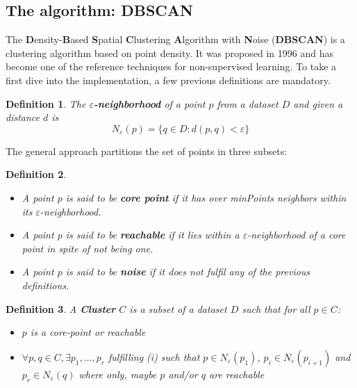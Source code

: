 \documentclass[10pt,journal,compsoc]{IEEEtran}
\newtheorem{definition}{Definition}
\begin{document}
\subsection{The algorithm: DBSCAN} \label{the_algorithm}


The \textbf{D}ensity-\textbf{B}ased \textbf{S}patial \textbf{C}lustering \textbf{A}lgorithm with \textbf{N}oise (\textbf{DBSCAN}) is a clustering algorithm based on point density. It was proposed in 1996 \cite{ReferencePaper} and has become one of the reference techniques for non-supervised learning. To take a first dive into the implementation, a few previous definitions are mandatory.

\begin{definition}
The $\varepsilon$\textbf{-neighborhood} of a point $p$ from a dataset $D$ and given a distance $d$ is
$$N_{\varepsilon}(p) = \lbrace q \in D: d(p,q) < \varepsilon \rbrace$$ 
\end{definition}

The general approach partitions the set of points in three subsets:
\begin{definition}
\begin{itemize}
\item A point $p$ is said to be \textbf{\textit{core point}} if it has over \textit{minPoints} neighbors within its $\varepsilon$-neighborhood.
\item A point $p$ is said to be \textbf{\textit{reachable}} if it lies within a $\varepsilon$-neighborhood of a core point in spite of not being one.
\item A point $p$ is said to be \textbf{\textit{noise}} if it does not fulfil any of the previous definitions.
\end{itemize}
\end{definition}

\begin{definition}
A \textbf{Cluster} $C$ is a subset of a dataset $D$ such that for all $p \in C$:
\begin{itemize}
\item[(i)] $p$ is a core-point or reachable
\item[(ii)] $\forall p,q \in C, \exists p_1, \ldots,  p_r$ fulfilling (i) such that $p \in N_{\varepsilon}(p_1)$, $p_i \in N_{\varepsilon}(p_{i+1})$ and $p_r \in N_{\varepsilon}(q)$ where only, maybe $p$ and/or $q$ are reachable
\end{itemize}
\end{definition}
\end{document}

